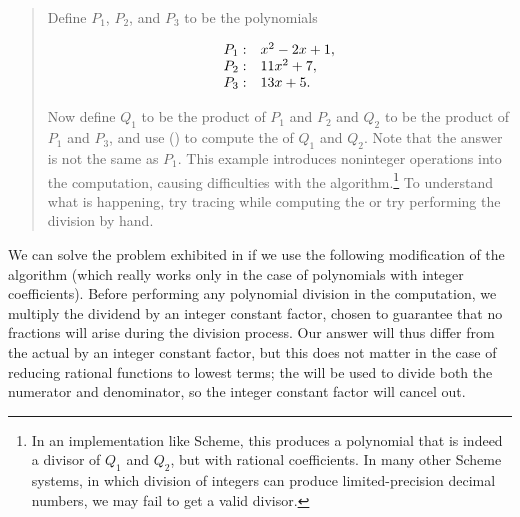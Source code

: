 \begin{quote}
 Define \( P_1 \), \( P_2 \), and
\( P_3 \) to be the polynomials
\begin{comment}

\begin{example}
P_1 : x^2 - 2x + 1

P_2 : 11x^2 + 7

P_3 : 13x + 5
\end{example}

\end{comment}

$$
\begin{array}{l@{{}:}l}
	P_1 	& \quad x^2 - 2x + 1, \\
	P_2 	& \quad 11x^2 + 7, \\
	P_3 	& \quad 13x + 5.
\end{array}
$$

Now define \( Q_1 \) to be the product of \( P_1 \) and \( P_2 \) and \( Q_2 \) to be
the product of \( P_1 \) and \( P_3 \), and use 
() to compute the  of \( Q_1 \)
and \( Q_2 \).
Note that the answer is not the same as \( P_1 \).  This example introduces
noninteger operations into the computation, causing difficulties with the
 algorithm.\footnote{In an implementation like 
Scheme, this produces a polynomial that is indeed a divisor of \( Q_1 \) and
\( Q_2 \), but with rational coefficients.  In many other Scheme systems, in
which division of integers can produce limited-precision decimal numbers, we
may fail to get a valid divisor.}  To understand what is happening, try tracing
 while computing the  or try performing the
division by hand.
\end{quote}

\noindent
We can solve the problem exhibited in  if we use the
following modification of the  algorithm (which really works only
in the case of polynomials with integer coefficients).  Before performing any
polynomial division in the  computation, we multiply the dividend
by an integer constant factor, chosen to guarantee that no fractions will arise
during the division process.  Our answer will thus differ from the actual
 by an integer constant factor, but this does not matter in the
case of reducing rational functions to lowest terms; the  will be
used to divide both the numerator and denominator, so the integer constant
factor will cancel out.

